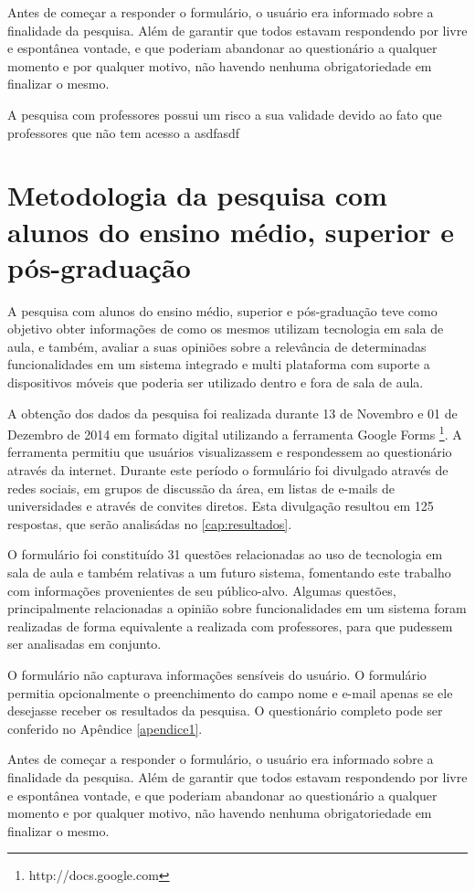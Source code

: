 Antes de começar a responder o formulário, o usuário era informado sobre a finalidade da pesquisa. Além de garantir que todos estavam respondendo por livre e espontânea vontade, e que poderiam abandonar ao questionário a qualquer momento e por qualquer motivo, não havendo nenhuma obrigatoriedade em finalizar o mesmo.

A pesquisa com professores possui um risco a sua validade devido ao fato que professores que não tem acesso a asdfasdf


\section{Metodologia da pesquisa com alunos do ensino médio, superior e pós-graduação}

A pesquisa com alunos do ensino médio, superior e pós-graduação teve como objetivo obter informações de como os mesmos utilizam tecnologia em sala de aula, e também, avaliar a suas opiniões sobre a relevância de determinadas funcionalidades em um sistema integrado e multi plataforma com suporte a dispositivos móveis que poderia ser utilizado dentro e fora de sala de aula.

A obtenção dos dados da pesquisa foi realizada durante 13 de Novembro e 01 de Dezembro de 2014 em formato digital utilizando a ferramenta Google Forms \footnote{http://docs.google.com}. A ferramenta permitiu que usuários visualizassem e respondessem ao questionário através da internet. Durante este período o formulário foi divulgado através de redes sociais, em grupos de discussão da área, em listas de e-mails de universidades e através de convites diretos. Esta divulgação resultou em 125 respostas, que serão analisádas no \ref{cap:resultados}.

O formulário foi constituído 31 questões relacionadas ao uso de tecnologia em sala de aula e também relativas a um futuro sistema, fomentando este trabalho com informações provenientes de seu público-alvo. Algumas questões, principalmente relacionadas a opinião sobre funcionalidades em um sistema foram realizadas de forma equivalente a realizada com professores, para que pudessem ser analisadas em conjunto.

O formulário não capturava informações sensíveis do usuário. O formulário permitia opcionalmente o preenchimento do campo nome e e-mail apenas se ele desejasse receber os resultados da pesquisa. O questionário completo pode ser conferido no Apêndice \ref{apendice1}.

Antes de começar a responder o formulário, o usuário era informado sobre a finalidade da pesquisa. Além de garantir que todos estavam respondendo por livre e espontânea vontade, e que poderiam abandonar ao questionário a qualquer momento e por qualquer motivo, não havendo nenhuma obrigatoriedade em finalizar o mesmo.


